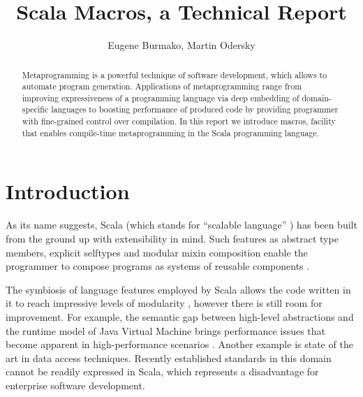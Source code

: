 \documentclass{llncs}
\begin{document}
\pagestyle{empty}
\mainmatter


\lstset{
  language=scala,
  basicstyle=\small,
  keywordstyle=\ttfamily,
  identifierstyle=\ttfamily,
  stringstyle=\ttfamily,
  breaklines=true,
  showstringspaces=false}

\title{Scala Macros, a Technical Report}
\author{Eugene Burmako, Martin Odersky}
\maketitle

\begin{abstract}
Metaprogramming is a powerful technique of software development, which allows to automate program generation. Applications of metaprogramming range from improving expressiveness of a programming language via deep embedding of domain-specific languages to boosting performance of produced code by providing programmer with fine-grained control over compilation. In this report we introduce macros, facility that enables compile-time metaprogramming in the Scala programming language.
\end{abstract}

\section{Introduction}

As its name suggests, Scala (which stands for ``scalable language'' \cite{odersky10}) has been built from the ground up with extensibility in mind. Such features as abstract type members, explicit selftypes and modular mixin composition enable the programmer to compose programs as systems of reusable components \cite{odersky05}.

The symbiosis of language features employed by Scala allows the code written in it to reach impressive levels of modularity \cite{odersky09}, however there is still room for improvement. For example, the semantic gap between high-level abstractions and the runtime model of Java Virtual Machine brings performance issues that become apparent in high-performance scenarios \cite{dragos08}. Another example is state of the art in data access techniques. Recently established standards in this domain \cite{box07} cannot be readily expressed in Scala, which represents a disadvantage for enterprise software development.
\end{document}
